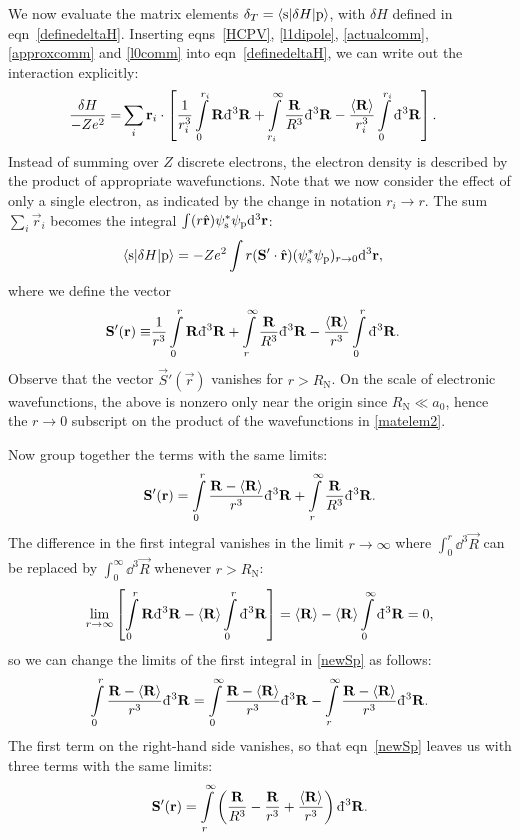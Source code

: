 We now evaluate the matrix elements $\delta_T=\langle\text{s}|\delta
H|\text{p}\rangle$, with $\delta H$ defined in eqn~\ref{definedeltaH}. Inserting
eqns~\ref{HCPV}, \ref{l1dipole}, \ref{actualcomm}, \ref{approxcomm} and
\ref{l0comm} into eqn~\ref{definedeltaH}, we can write out the interaction
explicitly:
%
\begin{align*}
    \frac
    {\delta H}
    {-Ze^2}
    =
    &\sum_i\mathbf{r}_i\cdot\left[
        \frac{1}{r_i^3}\int\limits_0^{r_i}\mathbf{R}\mathrm{d}\hspace*{-0.15em}\bar{}\hspace*{0.2em}^3\mathbf{R}
    +\int\limits_{r_i}^\infty\frac{\mathbf{R}}{R^3}\mathrm{d}\hspace*{-0.15em}\bar{}\hspace*{0.2em}^3\mathbf{R}
    -\frac{\langle \mathbf{R}\rangle}{r_i^3}\int\limits_0^{r_i}\mathrm{d}\hspace*{-0.15em}\bar{}\hspace*{0.2em}^3\mathbf{R}
\right].
\end{align*}
%
Instead of summing over $Z$ discrete electrons, the electron density is
described by the product of appropriate wavefunctions. Note that we now consider
the effect of only a single electron, as indicated by the change in notation
$r_i\to r$. The sum $\sum_i\vec r_i$ becomes the integral $\int(r\hat{\mathbf{r}})\psi^*_\text{s}\psi_\text{p}\mathrm{d}^3\mathbf{r}$:
%
\begin{align}
    \label{matelem2}
    \langle\text{s}|\delta H|\text{p}\rangle
    &=-Ze^2
    \int r(\mathbf{S}'\cdot\hat{\mathbf{r}})(\psi^*_\text{s}\psi_\text{p})_{r\to0}\mathrm{d}^3\mathbf{r},
\end{align}
%
where we define the vector
%
\begin{align*}
    \mathbf{S}'(\mathbf{r})\equiv
        &\frac{1}{r^3}\int\limits_0^{r}\mathbf{R}\mathrm{d}\hspace*{-0.15em}\bar{}\hspace*{0.2em}^3\mathbf{R}
        +\int\limits_{r}^\infty\frac{\mathbf{R}}{R^3}\mathrm{d}\hspace*{-0.15em}\bar{}\hspace*{0.2em}^3\mathbf{R}
        -\frac{\langle \mathbf{R}\rangle}{r^3}\int\limits_0^{r}\mathrm{d}\hspace*{-0.15em}\bar{}\hspace*{0.2em}^3\mathbf{R}.
\end{align*}
%
Observe that the vector $\vec S'(\vec r)$ vanishes for $r>R_\text{N}$. On the
scale of electronic wavefunctions, the above is nonzero only near the origin
since $R_\text{N}\ll a_0$, hence the $r\to0$ subscript on the product of the
wavefunctions in \ref{matelem2}.

Now group together the terms with the same limits:
%
\begin{equation}
    \label{newSp}
    \mathbf{S}'(\mathbf{r})=
    \int\limits_0^r\frac{\mathbf{R}-\langle \mathbf{R}\rangle}{r^3}\mathrm{d}\hspace*{-0.15em}\bar{}\hspace*{0.2em}^3\mathbf{R}
    +\int\limits_r^\infty\frac{\mathbf{R}}{R^3}\mathrm{d}\hspace*{-0.15em}\bar{}\hspace*{0.2em}^3\mathbf{R}.
\end{equation}
%
The difference in the first integral vanishes in the limit $r\to\infty$ where
$\int_0^r\dd^3\vec R$ can be replaced by $\int_0^\infty\dd^3\vec R$ whenever
$r>R_\text{N}$:
%
\[
    \lim\limits_{r\to\infty}
    \left[
        \int\limits_0^r\mathbf{R}\mathrm{d}\hspace*{-0.15em}\bar{}\hspace*{0.2em}^3\mathbf{R}-\langle \mathbf{R}\rangle\int\limits_0^r\mathrm{d}\hspace*{-0.15em}\bar{}\hspace*{0.2em}^3\mathbf{R}
        \right]
    =\langle \mathbf{R}\rangle-\langle \mathbf{R}\rangle\int\limits_0^\infty\mathrm{d}\hspace*{-0.15em}\bar{}\hspace*{0.2em}^3\mathbf{R}=0,
\]
%
so we can change the limits of the first integral in \ref{newSp} as follows:
%
\[
    \int\limits_0^r\frac{\mathbf{R}-\langle \mathbf{R}\rangle}{r^3}\mathrm{d}\hspace*{-0.15em}\bar{}\hspace*{0.2em}^3\mathbf{R}
    =\int\limits_0^\infty\frac{\mathbf{R}-\langle \mathbf{R}\rangle}{r^3}\mathrm{d}\hspace*{-0.15em}\bar{}\hspace*{0.2em}^3\mathbf{R}
    -\int\limits_r^\infty\frac{\mathbf{R}-\langle \mathbf{R}\rangle}{r^3}\mathrm{d}\hspace*{-0.15em}\bar{}\hspace*{0.2em}^3\mathbf{R}.
\]
%
The first term on the right-hand side vanishes, so that eqn~\ref{newSp} leaves
us with three terms with the same limits:
%
\begin{equation}
    \label{finalSp}
    \mathbf{S}'(\mathbf{r})=
    \int\limits_r^\infty
    \left(
        \frac{\mathbf{R}}{R^3}-\frac{\mathbf{R}}{r^3}+\frac{\langle \mathbf{R}\rangle}{r^3}
    \right)
    \mathrm{d}\hspace*{-0.15em}\bar{}\hspace*{0.2em}^3\mathbf{R}.
\end{equation}

